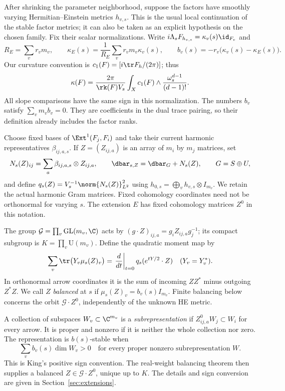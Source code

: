 After shrinking the parameter neighborhood, suppose the factors have
smoothly varying Hermitian--Einstein metrics $h_{v,s}$. This is the usual
local continuation of the stable factor metrics; it can also be taken as
an explicit hypothesis on the chosen family. Fix their scalar
normalizations. Write $i\Lambda_sF_{h_{v,s}}=\kappa_v(s)\id_{F_v}$ and
\begin{equation}\label{eq:kappa}
R_E=\sum_vr_vm_v,\qquad
\kappa_E(s)=\frac{1}{R_E}\sum_vr_vm_v\kappa_v(s),\qquad
b_v(s)=-r_v\bigl(\kappa_v(s)-\kappa_E(s)\bigr).
\end{equation}
Our curvature convention is $c_1(F)=[i\tr F_h/(2\pi)]$; thus
\begin{equation}\label{eq:degree}
\kappa(F)=\frac{2\pi}{\rk(F)V_s}
\int_Xc_1(F)\wedge\frac{\omega_s^{d-1}}{(d-1)!}.
\end{equation}
All slope comparisons have the same sign in this normalization.
The numbers $b_v$ satisfy $\sum_vm_vb_v=0$. They are coefficients in
the dual trace pairing, so their definition already includes the factor
ranks.

Choose fixed bases of $\Ext^1(F_j,F_i)$ and take their current harmonic
representatives $\beta_{ij,a,s}$. If $Z=(Z_{ij,a})$ is an array of
$m_i$ by $m_j$ matrices, set
\begin{equation}\label{eq:harmonic}
N_s(Z)_{ij}=\sum_a\beta_{ij,a,s}\otimes Z_{ij,a},\qquad
\dbar_{s,Z}=\dbar_G+N_s(Z),\qquad G=S\oplus U,
\end{equation}
and define $q_s(Z)=V_s^{-1}\norm{N_s(Z)}_{L^2}^2$ using
$h_{0,s}=\bigoplus_vh_{v,s}\otimes I_{m_v}$. We retain the actual
harmonic Gram matrices. Fixed cohomology coordinates need not be
orthonormal for varying $s$. The extension $E$ has fixed cohomology
matrices $Z^0$ in this notation.

The group $\mathcal G=\prod_v\mathrm{GL}(m_v,\C)$ acts by
$(g\cdot Z)_{ij,a}=g_iZ_{ij,a}g_j^{-1}$; its compact subgroup is
$K=\prod_v\mathrm U(m_v)$. Define the quadratic moment map by
\begin{equation}\label{eq:momentdefinition}
\sum_v\tr\bigl(Y_v\mu_s(Z)_v\bigr)
=\left.\frac{d}{dt}\right|_{t=0}q_s(e^{tY/2}\cdot Z)
\quad(Y_v=Y_v^*).
\end{equation}
In orthonormal arrow coordinates it is the sum of incoming $ZZ^*$ minus
outgoing $Z^*Z$. We call $Z$ \emph{balanced} at $s$ if
$\mu_s(Z)_v=b_v(s)I_{m_v}$. Finite balancing below concerns the orbit
$\mathcal G\cdot Z^0$, independently of the unknown HE metric.

A collection of subspaces $W_v\subset\C^{m_v}$ is a
\emph{subrepresentation} if $Z^0_{ij,a}W_j\subset W_i$ for every arrow.
It is proper and nonzero if it is neither the whole collection nor zero.
The representation is $b(s)$-stable when
\begin{equation}\label{eq:finite-stability}
\sum_vb_v(s)\dim W_v>0
\quad\text{for every proper nonzero subrepresentation }W.
\end{equation}
This is King's positive sign convention. The real-weight balancing theorem
then supplies a balanced $Z\in\mathcal G\cdot Z^0$, unique up to $K$.
The details and sign conversion are given in Section~\ref{sec:extensions}.

